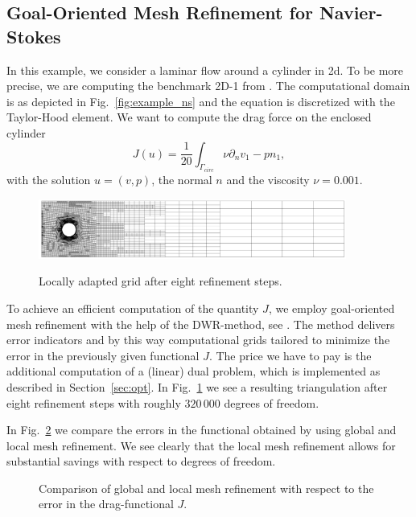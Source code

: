 \documentclass[smallextended]{svjour3}       %
\numberwithin{equation}{section}
\begin{document}
\subsection{Goal-Oriented Mesh Refinement for Navier-Stokes}
In this example, we consider a laminar flow around a cylinder in 2d. To be more precise, we are computing the benchmark 2D-1 from \cite{TuSchae96}. The computational domain is as depicted in Fig.~\ref{fig:example_ns} and the equation is discretized with the Taylor-Hood  element. We want to compute the drag force on the enclosed cylinder
\begin{equation}
J(u) = \frac 1 {20} \int_{\Gamma_{circ}} \nu\partial_nv _1 - pn_1,
\end{equation}
with the solution $u = (v,p)$, the normal $n$ and the viscosity $\nu = 0.001$.
\begin{figure}[hbt]
\centering
{\includegraphics[width=0.9\textwidth]{Pictures/local_grid_NS.png}}
\caption{Locally adapted grid after eight refinement steps.}
\label{fig:NS_local_grid}
\end{figure}
To achieve an efficient computation of the quantity $J$, we employ goal-oriented mesh refinement with the help of the DWR-method, see \cite{BeRa96}. The method delivers error indicators and by this way computational grids tailored to minimize the error in the previously given functional $J$. The price we have to pay is the additional computation of a (linear) dual problem, which is implemented as described in Section~\ref{sec:opt}. In Fig.~\ref{fig:NS_local_grid} we see a resulting triangulation after eight refinement steps with roughly $320\,000$ degrees of freedom.

In Fig.~\ref{fig:NS_comparison} we compare the errors in the functional obtained by using global and local mesh refinement. We see clearly that the local mesh refinement allows for substantial savings with respect to degrees of freedom.

\begin{figure}[hbt]
\centering
\resizebox{0.5\textwidth}{!}{}
\caption{Comparison of global and local mesh refinement with respect to the error in the drag-functional $J$.}
\label{fig:NS_comparison}
\end{figure}
\end{document}
